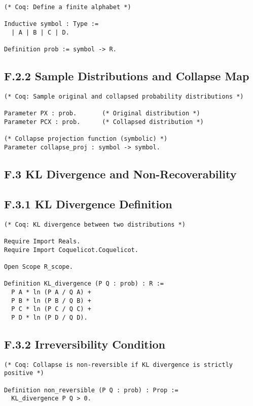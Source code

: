 \documentclass[11pt]{article}
\begin{document}
\begin{lstlisting}
(* Coq: Define a finite alphabet *)

Inductive symbol : Type :=
  | A | B | C | D.

Definition prob := symbol -> R.
\end{lstlisting}

\subsection*{F.2.2 Sample Distributions and Collapse Map}

\begin{lstlisting}
(* Coq: Sample original and collapsed probability distributions *)

Parameter PX : prob.       (* Original distribution *)
Parameter PCX : prob.      (* Collapsed distribution *)

(* Collapse projection function (symbolic) *)
Parameter collapse_proj : symbol -> symbol.
\end{lstlisting}

\subsection*{F.3 KL Divergence and Non-Recoverability}

\subsection*{F.3.1 KL Divergence Definition}

\begin{lstlisting}
(* Coq: KL divergence between two distributions *)

Require Import Reals.
Require Import Coquelicot.Coquelicot.

Open Scope R_scope.

Definition KL_divergence (P Q : prob) : R :=
  P A * ln (P A / Q A) +
  P B * ln (P B / Q B) +
  P C * ln (P C / Q C) +
  P D * ln (P D / Q D).
\end{lstlisting}

\subsection*{F.3.2 Irreversibility Condition}

\begin{lstlisting}
(* Coq: Collapse is non-reversible if KL divergence is strictly positive *)

Definition non_reversible (P Q : prob) : Prop :=
  KL_divergence P Q > 0.
\end{lstlisting}
\end{document}

